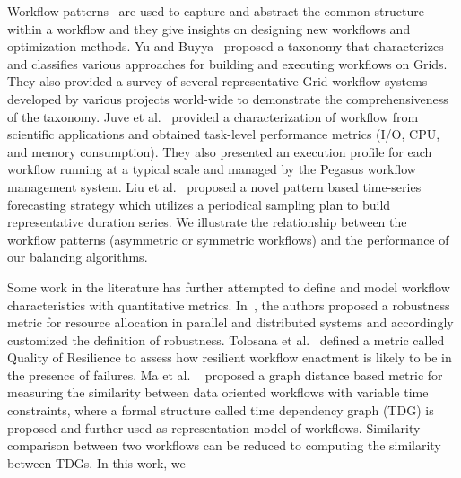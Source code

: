 Workflow patterns~\cite{Yu2005a, Juve2013, Liu2008} are used to capture and abstract the common structure within a workflow and they give insights on designing new workflows and optimization methods. Yu and Buyya~\cite{Yu2005a} proposed a taxonomy that characterizes and classifies various approaches for building and executing workflows on Grids. They also provided a survey of several representative Grid workflow systems developed by various projects world-wide to demonstrate the comprehensiveness of the taxonomy. Juve et al.~\cite{Juve2013} provided a characterization of workflow from  scientific applications and obtained task-level performance metrics (I/O, CPU, and memory consumption). They also presented an execution profile for each workflow running at a typical scale and managed by the Pegasus workflow management system. Liu et al.~\cite{Liu2008} proposed a novel pattern based time-series forecasting strategy which utilizes a periodical sampling plan to build representative duration series. We illustrate the relationship between the workflow patterns (asymmetric or symmetric workflows) and the performance of our balancing algorithms. 

Some work in the literature has further attempted to define and model workflow characteristics with quantitative metrics. In~\cite{Ali2004}, the authors proposed a robustness metric for resource allocation in parallel and distributed systems and accordingly customized the definition of robustness. Tolosana et al.~\cite{Tolosana2011} defined a metric called Quality of Resilience to assess how resilient workflow enactment is likely to be in the presence of failures. Ma et al. ~\cite{Ma:2014:GDB:2560969.2561388} proposed a graph distance based metric for measuring the similarity between data oriented workflows with variable time constraints, where a formal structure called time dependency graph (TDG) is proposed and further used as representation model of workflows. Similarity comparison between two workflows can be reduced to computing the similarity between TDGs. In this work, we 

